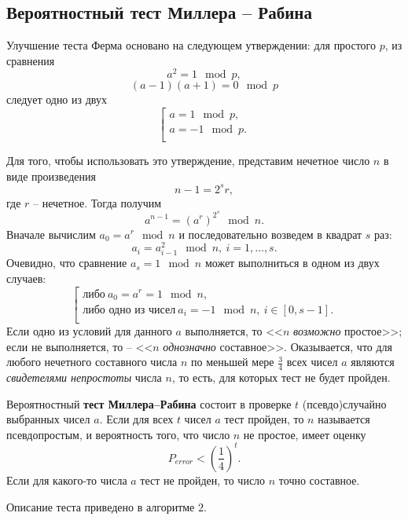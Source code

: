 \subsection{Вероятностный тест Миллера -- Рабина}

Улучшение теста Ферма основано на следующем утверждении: для простого $p$, из сравнения
    \[ a^2 = 1 \mod p, \]
    \[ (a-1)(a+1) = 0 \mod p \]
следует одно из двух
\[ \left[ \begin{array}{l}
     a = 1 \mod p, \\
     a = -1 \mod p. \\
\end{array} \right. \]

Для того, чтобы использовать это утверждение, представим нечетное число $n$  в виде произведения
    \[ n-1 = 2^s r, \]
где $r$ -- нечетное. Тогда получим
    \[ a^{n-1} = (a^r)^{2^s} \mod n. \]
Вначале вычислим $a_0 = a^r \mod n$ и последовательно возведем в квадрат $s$ раз:
    \[ a_i = a_{i-1}^2 \mod n, ~ i = 1, \dots, s. \]
Очевидно, что сравнение $a_s = 1 \mod n$ может выполниться в одном из двух случаев:
\[ \left[ \begin{array}{l}
    \text{либо}~ a_0 = a^r = 1 \mod n, \\
    \text{либо одно из чисел}~ a_i = -1 \mod n, ~ i \in [0, s-1]. \\
\end{array} \right. \]
Если одно из условий для данного $a$  выполняется, то  <<$n$ \emph{возможно} простое>>; если не выполняется, то -- <<$n$ \emph{однозначно} составное>>. Оказывается, что для любого нечетного составного числа $n$ по меньшей мере $\frac{3}{4}$ всех чисел $a$ являются \emph{свидетелями непростоты} числа $n$, то есть, для которых тест не будет пройден.

Вероятностный \textbf{тест Миллера--Рабина} состоит в проверке $t$ (псевдо)случайно выбранных чисел $a$. Если для всех $t$ чисел $a$ тест пройден, то $n$ называется псевдопростым, и вероятность того, что число $n$ не простое, имеет оценку
    \[ P_{error} < \left( \frac{1}{4} \right)^t. \]
Если для какого-то числа $a$ тест не пройден, то число $n$ точно составное.

Описание теста приведено в алгоритме $2$.

